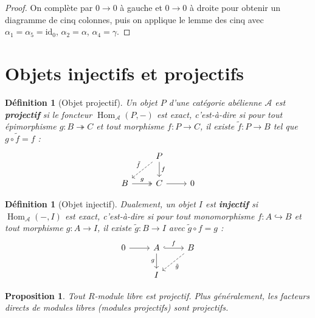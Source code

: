 \documentclass[a4paper,12pt]{book}
\DeclareMathOperator{\Hom}{Hom}
\newcommand{\id}{\mathrm{id}}
\newtheorem{proposition}[theoreme]{Proposition}
\newtheorem{definition}[theoreme]{Définition}
\begin{document}
\begin{proof}
On complète par $0 \to 0$ à gauche et $0 \to 0$ à droite pour obtenir
un diagramme de cinq colonnes, puis on applique le lemme des cinq avec
$\alpha_1 = \alpha_5 = \id_0$, $\alpha_2 = \alpha$, $\alpha_4 = \gamma$.
\end{proof}


\section{Objets injectifs et projectifs}\label{sec:injective-projective}

\begin{definition}[Objet projectif]\label{def:projective-object}
Un objet $P$ d'une catégorie abélienne $\mathcal{A}$ est \textbf{projectif}
si le foncteur $\Hom_{\mathcal{A}}(P, -)$ est exact, c'est-à-dire si
pour tout épimorphisme $g \colon B \twoheadrightarrow C$ et tout morphisme
$f \colon P \to C$, il existe $\tilde{f} \colon P \to B$ tel que
$g \circ \tilde{f} = f$ :
\[
\begin{tikzcd}
& P \arrow[d, "f"] \arrow[dl, dashed, "\tilde{f}"'] \\
B \arrow[r, two heads, "g"] & C \arrow[r] & 0
\end{tikzcd}
\]
\end{definition}

\begin{definition}[Objet injectif]\label{def:injective-object}
Dualement, un objet $I$ est \textbf{injectif} si $\Hom_{\mathcal{A}}(-, I)$
est exact, c'est-à-dire si pour tout monomorphisme $f \colon A \hookrightarrow B$
et tout morphisme $g \colon A \to I$, il existe $\tilde{g} \colon B \to I$
avec $\tilde{g} \circ f = g$ :
\[
\begin{tikzcd}
0 \arrow[r] & A \arrow[r, hook, "f"] \arrow[d, "g"'] & B \arrow[dl, dashed, "\tilde{g}"] \\
& I &
\end{tikzcd}
\]
\end{definition}

\begin{proposition}\label{prop:free-projective}
Tout $R$-module libre est projectif. Plus généralement, les
facteurs directs de modules libres (modules projectifs) sont projectifs.
\end{proposition}
\end{document}

